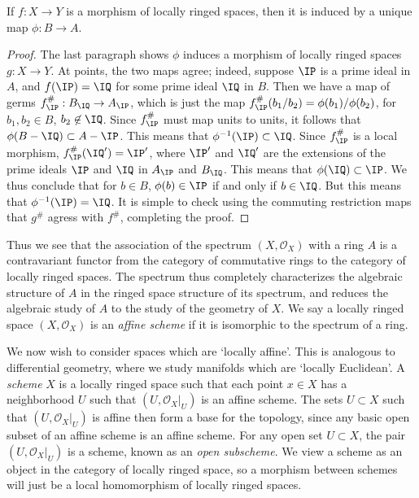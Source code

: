 \begin{theorem}
    If $f: X \to Y$ is a morphism of locally ringed spaces, then it is induced by a unique map $\phi: B \to A$.
\end{theorem}
\begin{proof}
    The last paragraph shows $\phi$ induces a morphism of locally ringed spaces $g: X \to Y$. At points, the two maps agree; indeed, suppose $\IP$ is a prime ideal in $A$, and $f(\IP) = \IQ$ for some prime ideal $\IQ$ in $B$. Then we have a map of germs $f^\#_{\IP}: B_{\IQ} \to A_{\IP}$, which is just the map $f^\#_{\IP}(b_1/b_2) = \phi(b_1)/\phi(b_2)$, for $b_1,b_2 \in B$, $b_2 \not \in \IQ$. Since $f^\#_{\IP}$ must map units to units, it follows that $\phi(B - \IQ) \subset A - \IP$. This means that $\phi^{-1}(\IP) \subset \IQ$. Since $f^\#_{\IP}$ is a local morphism, $f^\#_{\IP}(\IQ') = \IP'$, where $\IP'$ and $\IQ'$ are the extensions of the prime ideals $\IP$ and $\IQ$ in $A_{\IP}$ and $B_{\IQ}$. This means that $\phi(\IQ) \subset \IP$. We thus conclude that for $b \in B$, $\phi(b) \in \IP$ if and only if $b \in \IQ$. But this means that $\phi^{-1}(\IP) = \IQ$. It is simple to check using the commuting restriction maps that $g^\#$ agress with $f^\#$, completing the proof.
\end{proof}

Thus we see that the association of the spectrum $(X,\mathcal{O}_X)$ with a ring $A$ is a contravariant functor from the category of commutative rings to the category of locally ringed spaces. The spectrum thus completely characterizes the algebraic structure of $A$ in the ringed space structure of its spectrum, and reduces the algebraic study of $A$ to the study of the geometry of $X$. We say a locally ringed space $(X,\mathcal{O}_X)$ is an \emph{affine scheme} if it is isomorphic to the spectrum of a ring.

We now wish to consider spaces which are `locally affine'. This is analogous to differential geometry, where we study manifolds which are `locally Euclidean'. A \emph{scheme} $X$ is a locally ringed space such that each point $x \in X$ has a neighborhood $U$ such that $(U,\mathcal{O}_X|_U)$ is an affine scheme. The sets $U \subset X$ such that $(U,\mathcal{O}_X|_U)$ is affine then form a base for the topology, since any basic open subset of an affine scheme is an affine scheme. For any open set $U \subset X$, the pair $(U,\mathcal{O}_X|_U)$ is a scheme, known as an \emph{open subscheme}. We view a scheme as an object in the category of locally ringed space, so a morphism between schemes will just be a local homomorphism of locally ringed spaces.

